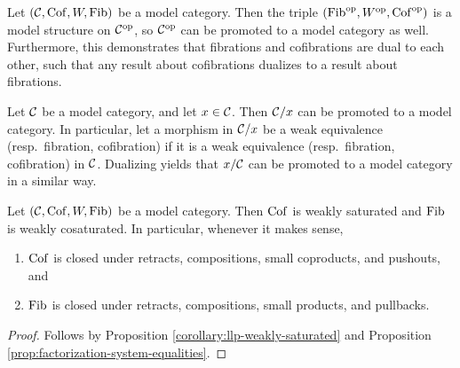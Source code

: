 \begin{construction}[Opposites]
	Let \((\mathcal{C}, \operatorname{Cof}, W, \operatorname{Fib})\) be a model category. Then the triple \((\operatorname{Fib}^{\mathrm{op}}, W^{\mathrm{op}}, \operatorname{Cof}^{\mathrm{op}})\) is a model structure on \(\mathcal{C}^{\mathrm{op}}\), so \(\mathcal{C}^{\mathrm{op}}\) can be promoted to a model category
	as well. Furthermore, this demonstrates that fibrations and cofibrations are dual to each other, such that any result about cofibrations dualizes to a result about fibrations.
\end{construction}
\begin{construction}[Slices]
	Let \(\mathcal{C}\) be a model category, and let \(x\in\mathcal{C}\). Then \(\mathcal{C}/x\) can be promoted to a model category. In particular, let a morphism in \(\mathcal{C}/x\) be a weak equivalence (resp.\ fibration, cofibration)
	if it is a weak equivalence (resp.\ fibration, cofibration) in \(\mathcal{C}\). Dualizing yields that \(x/\mathcal{C}\) can be promoted to a model category in a similar way.
\end{construction}

\begin{proposition}\label{prop:model-category-cof-saturated-fib-cosaturated}
	Let \((\mathcal{C},\operatorname{Cof},W,\operatorname{Fib})\) be a model category. Then \(\operatorname{Cof}\) is weakly saturated and \(\operatorname{Fib}\) is weakly cosaturated. In particular, whenever it makes sense,
	\begin{enumerate}[label=(\arabic*)]
		\item \(\operatorname{Cof}\) is closed under retracts, compositions, small coproducts, and pushouts, and
		\item \(\operatorname{Fib}\) is closed under retracts, compositions, small products, and pullbacks.
	\end{enumerate}
\end{proposition}
\begin{proof}
Follows by Proposition \ref{corollary:llp-weakly-saturated} and Proposition \ref{prop:factorization-system-equalities}.
\end{proof}

